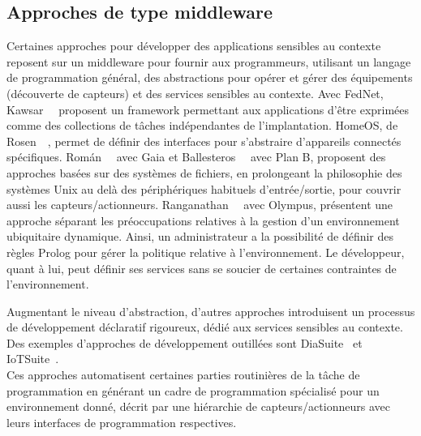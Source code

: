 

\subsection{Approches de type middleware}
Certaines approches pour développer des applications sensibles au contexte 
reposent sur un middleware pour fournir aux programmeurs, utilisant un langage 
de programmation général, des abstractions pour opérer et gérer des équipements 
(\eg découverte de capteurs) et des services sensibles au contexte.
Avec FedNet,  Kawsar~\etal~\parencite{kawsar2088deploy} proposent un framework permettant 
aux applications d'être exprimées comme des collections de tâches indépendantes 
de l'implantation. HomeOS, de Rosen~\etal~\parencite{rosen2004homeos}, permet de définir des interfaces 
pour s'abstraire d'appareils connectés spécifiques. 
Román~\etal~\parencite{roman2002middleware} avec Gaia et Ballesteros~\etal~\parencite{ballesteros2006planb} avec Plan B, 
proposent des approches basées sur des systèmes de fichiers, en prolongeant
la philosophie des systèmes Unix au delà des périphériques habituels d'entrée/sortie,
pour couvrir aussi les capteurs/actionneurs.
Ranganathan~\etal~\parencite{ranganathan2005olympus} avec Olympus, présentent une approche séparant les 
préoccupations relatives à la gestion d'un environnement ubiquitaire dynamique. Ainsi, un administrateur a la 
possibilité de définir des règles Prolog pour gérer la politique relative à 
l'environnement. Le développeur, quant à lui, peut définir ses services sans se soucier de certaines 
contraintes de l'environnement.

Augmentant le niveau d'abstraction, d'autres approches introduisent un processus 
de développement déclaratif rigoureux, dédié aux services sensibles au contexte. 
Des exemples d'approches de développement 
outillées sont DiaSuite~\parencite{bertran2014diasuite,cassou2012toward} et IoTSuite~\parencite{patel2015enabling}.\\
Ces approches automatisent certaines parties routinières de la tâche de programmation 
en générant un cadre de programmation spécialisé pour un environnement donné, décrit par une
hiérarchie de capteurs/actionneurs avec leurs interfaces de programmation respectives. 

